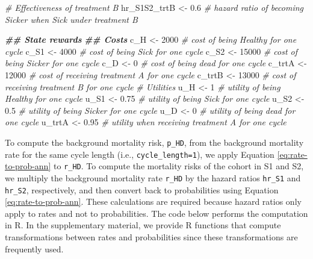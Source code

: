 \documentclass[
]{article}
\newenvironment{Shaded}{\begin{snugshade}}{\end{snugshade}}
\newcommand{\CommentTok}[1]{\textcolor[rgb]{0.56,0.35,0.01}{\textit{#1}}}
\newcommand{\DecValTok}[1]{\textcolor[rgb]{0.00,0.00,0.81}{#1}}
\newcommand{\DocumentationTok}[1]{\textcolor[rgb]{0.56,0.35,0.01}{\textbf{\textit{#1}}}}
\newcommand{\FloatTok}[1]{\textcolor[rgb]{0.00,0.00,0.81}{#1}}
\newcommand{\NormalTok}[1]{#1}
\newcommand{\OtherTok}[1]{\textcolor[rgb]{0.56,0.35,0.01}{#1}}
\begin{document}
\begin{Shaded}
\begin{Highlighting}[]
\CommentTok{\# Effectiveness of treatment B}
\NormalTok{hr\_S1S2\_trtB }\OtherTok{\textless{}{-}} \FloatTok{0.6} \CommentTok{\# hazard ratio of becoming Sicker when Sick under treatment B}

\DocumentationTok{\#\# State rewards}
\DocumentationTok{\#\# Costs}
\NormalTok{c\_H    }\OtherTok{\textless{}{-}} \DecValTok{2000}  \CommentTok{\# cost of being Healthy for one cycle }
\NormalTok{c\_S1   }\OtherTok{\textless{}{-}} \DecValTok{4000}  \CommentTok{\# cost of being Sick for one cycle }
\NormalTok{c\_S2   }\OtherTok{\textless{}{-}} \DecValTok{15000} \CommentTok{\# cost of being Sicker for one cycle}
\NormalTok{c\_D    }\OtherTok{\textless{}{-}} \DecValTok{0}     \CommentTok{\# cost of being dead for one cycle}
\NormalTok{c\_trtA }\OtherTok{\textless{}{-}} \DecValTok{12000} \CommentTok{\# cost of receiving treatment A for one cycle}
\NormalTok{c\_trtB }\OtherTok{\textless{}{-}} \DecValTok{13000} \CommentTok{\# cost of receiving treatment B for one cycle }
\CommentTok{\# Utilities}
\NormalTok{u\_H    }\OtherTok{\textless{}{-}} \DecValTok{1}     \CommentTok{\# utility of being Healthy for one cycle }
\NormalTok{u\_S1   }\OtherTok{\textless{}{-}} \FloatTok{0.75}  \CommentTok{\# utility of being Sick for one cycle }
\NormalTok{u\_S2   }\OtherTok{\textless{}{-}} \FloatTok{0.5}   \CommentTok{\# utility of being Sicker for one cycle}
\NormalTok{u\_D    }\OtherTok{\textless{}{-}} \DecValTok{0}     \CommentTok{\# utility of being dead for one cycle}
\NormalTok{u\_trtA }\OtherTok{\textless{}{-}} \FloatTok{0.95}  \CommentTok{\# utility when receiving treatment A for one cycle}
\end{Highlighting}
\end{Shaded}

To compute the background mortality risk, \texttt{p\_HD}, from the background mortality rate for the same cycle length (i.e., \texttt{cycle\_length=1}), we apply Equation \eqref{eq:rate-to-prob-ann} to \texttt{r\_HD}. To compute the mortality risks of the cohort in S1 and S2, we multiply the background mortality rate \texttt{r\_HD} by the hazard ratios \texttt{hr\_S1} and \texttt{hr\_S2}, respectively, and then convert back to probabilities using Equation \eqref{eq:rate-to-prob-ann}. These calculations are required because hazard ratios only apply to rates and not to probabilities. The code below performs the computation in R. In the supplementary material, we provide R functions that compute transformations between rates and probabilities since these transformations are frequently used.
\end{document}
